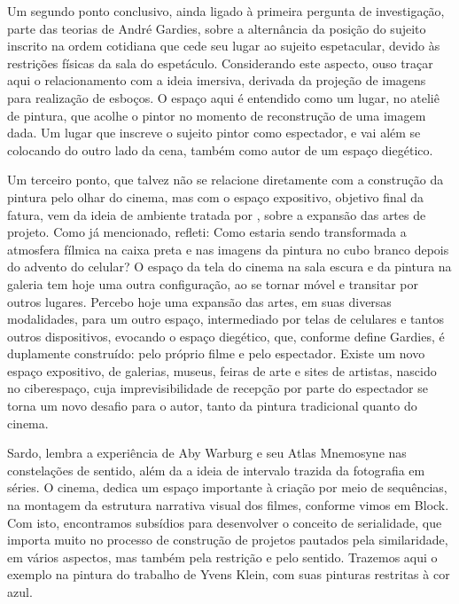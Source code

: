 Um segundo ponto conclusivo, ainda ligado à primeira pergunta de
investigação, parte das teorias de André Gardies, sobre a alternância
da posição do sujeito inscrito na ordem cotidiana que cede seu lugar ao
sujeito espetacular, devido às restrições físicas da sala do
espetáculo. Considerando este aspecto, ouso traçar aqui o
relacionamento com a ideia imersiva, derivada da projeção de imagens
para realização de esboços. O espaço aqui é entendido como um lugar, no
ateliê de pintura, que acolhe o pintor no momento de reconstrução de
uma imagem dada. Um lugar que inscreve o sujeito pintor como espectador, e vai além se
colocando do outro lado da cena, também como autor de um espaço
diegético. 

Um terceiro ponto, que talvez não se relacione diretamente
com a construção da pintura pelo olhar do cinema, mas com o espaço
expositivo, objetivo final da fatura, vem da ideia de ambiente tratada
por \textcite{sardo2017exercicio}, sobre a expansão das artes de projeto. Como já
mencionado, refleti: Como estaria sendo transformada a atmosfera
fílmica na caixa preta e nas imagens da pintura no cubo branco depois
do advento do celular? O espaço da tela do cinema na sala escura e da
pintura na galeria tem hoje uma outra configuração, ao se tornar móvel
e transitar por outros lugares. Percebo hoje uma expansão das artes, em
suas diversas modalidades, para um outro espaço, intermediado por telas
de celulares e tantos outros dispositivos, evocando o espaço diegético,
que, conforme define Gardies, é duplamente construído: pelo próprio
filme e pelo espectador. Existe um novo espaço expositivo, de galerias,
museus, feiras de arte e sites de artistas, nascido no ciberespaço,
cuja imprevisibilidade de recepção por parte do espectador se torna um
novo desafio para o autor, tanto da pintura tradicional quanto do
cinema.

Sardo, lembra a experiência de Aby Warburg e seu Atlas Mnemosyne nas
constelações de sentido, além da a ideia de intervalo trazida da
fotografia em séries. O cinema, dedica um espaço importante à criação
por meio de sequências, na montagem da estrutura narrativa visual dos
filmes, conforme vimos em Block. Com isto, encontramos subsídios para
desenvolver o conceito de serialidade, que importa muito no processo de
construção de projetos pautados pela similaridade, em vários aspectos,
mas também pela restrição e pelo sentido. Trazemos aqui o exemplo na
pintura do trabalho de Yvens Klein, com suas pinturas restritas à cor
azul.

